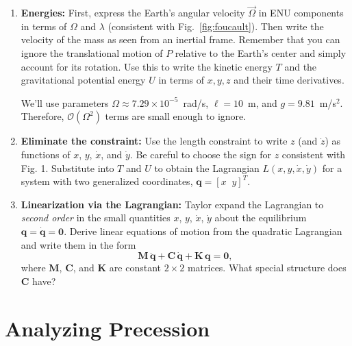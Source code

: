 \documentclass[11pt,letterpaper]{article}
\newcommand{\bq}{\mathbf{q}}
\newcommand{\bM}{\mathbf{M}}
\begin{document}
\begin{enumerate}[label=(\alph*)]
    \item \textbf{Energies:} First, express the Earth's angular velocity $\vec{\Omega}$ in ENU components in terms of $\Omega$ and $\lambda$ (consistent with Fig.~\ref{fig:foucault}). Then write the velocity of the mass as seen from an inertial frame. Remember that you can ignore the translational motion of $P$ relative to the Earth's center and simply account for its rotation. Use this to write the kinetic energy $T$ and the gravitational potential energy $U$ in terms of $x, y, z$ and their time derivatives.

    We'll use parameters $\Omega \approx 7.29\times10^{-5}$~rad/s, $\ell = 10$~m, and $g = 9.81$~m/s$^2$. Therefore,  $\mathcal{O}(\Omega^2)$ terms are small enough to ignore.

    \item \textbf{Eliminate the constraint:} Use the length constraint to write $z$ (and $\dot z$) as functions of $x$, $y$, $\dot x$, and $\dot y$. Be careful to choose the sign for $z$ consistent with Fig. 1. Substitute into $T$ and $U$ to obtain the Lagrangian $L(x,y,\dot x,\dot y)$ for a system with two generalized coordinates, $\bq = [x\;\; y]^T$.

    \item \textbf{Linearization via the Lagrangian:} Taylor expand the Lagrangian to \emph{second order} in the small quantities $x$, $y$, $\dot x$, $\dot y$ about the equilibrium $\bq=\dot{\bq}=\mathbf{0}$. Derive linear equations of motion from the quadratic Lagrangian and write them in the form
        \begin{equation} \label{ode}
        \bM\,\ddot{\bq} + \mathbf{C}\,\dot{\bq} + \mathbf{K}\,\bq = \mathbf{0},
        \end{equation}
        where $\bM$, $\mathbf{C}$, and $\mathbf{K}$ are constant $2\times2$ matrices. What special structure does $\mathbf{C}$ have?
\end{enumerate}

\section{Analyzing Precession}
\end{document}
